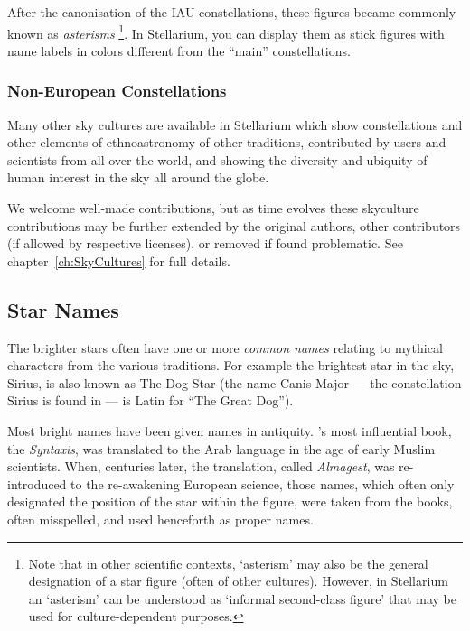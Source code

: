 After the canonisation of the IAU constellations, these figures became commonly known as \emph{asterisms}%
\footnote{Note that in other scientific contexts, `asterism' may also be the general designation of a star figure (often of other cultures). 
However, in Stellarium an `asterism' can be understood as `informal second-class figure' that may be used for culture-dependent purposes.}. 
In Stellarium, you can display them as stick figures with name labels in colors different from the ``main'' constellations. 

\subsubsection{Non-European Constellations}
\label{sec:Phenomena:OtherSkycultures}

Many other sky cultures are available in Stellarium which show constellations and other elements of ethnoastronomy 
of other traditions, contributed by users and scientists from all over the world, and showing the diversity 
and ubiquity of human interest in the sky all around the globe.
 
We welcome well-made contributions, but as time evolves these skyculture contributions may be further extended by the original authors, 
other contributors (if allowed by respective licenses), or removed if found problematic. See chapter~\ref{ch:SkyCultures} for full details.


\subsection{Star Names}
\label{sec:Phenomena:StarNames}

The brighter stars often have one or more \emph{common
names} relating to mythical characters from the various traditions. For
example the brightest star in the sky, Sirius, is also known as The Dog
Star (the name Canis Major --- the constellation Sirius is found in ---
is Latin for ``The Great Dog''). 

Most bright names have been given names in antiquity. 's most
influential book, the \emph{Syntaxis}, was translated to the Arab
language in the age of early Muslim scientists. When, centuries later,
the translation, called \emph{Almagest}, was re-introduced to the
re-awakening European science, those names, which often only designated
the position of the star within the figure, were taken from the books,
often misspelled, and used henceforth as proper names.

